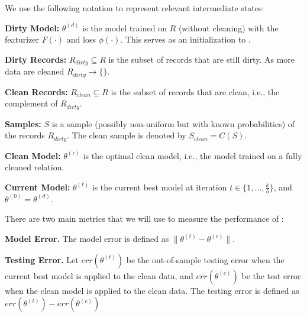 We use the following notation to represent relevant intermediate states:

\vspace{0.25em}

\noindent\textbf{Dirty Model: } $\theta^{(d)}$ is the model trained on $R$ (without cleaning) with the featurizer $F(\cdot)$ and loss $\phi(\cdot)$. This serves as an initialization to \sys.

\vspace{0.25em}

\noindent\textbf{Dirty Records: } $R_{dirty} \subseteq R$ is the subset of records that are still dirty. As more data are cleaned $R_{dirty} \rightarrow \{\}$.

\vspace{0.25em}

\noindent\textbf{Clean Records: } $R_{clean} \subseteq R$ is the subset of records that are clean, i.e., the complement of $R_{dirty}$.

\vspace{0.25em}

\noindent\textbf{Samples: } $S$ is a sample (possibly non-uniform but with known probabilities) of the records $R_{dirty}$. The clean sample is denoted by $S_{clean} = C(S)$.

\vspace{0.25em}

\noindent\textbf{Clean Model: } $\theta^{(c)}$ is the optimal clean model, i.e., the model trained on a fully cleaned relation.

\noindent\textbf{Current Model: } $\theta^{(t)}$ is the current best model at iteration $t \in \{1,...,\frac{k}{b}\}$, and $\theta^{(0)} = \theta^{(d)}$. 

\vspace{1.5em}

There are two main metrics that we will use to measure the performance of \sys:

\vspace{0.25em}

\noindent\textbf{Model Error. } The model error is defined as $\|\theta^{(t)} - \theta^{(c)}\|$.

\vspace{0.25em}

\noindent\textbf{Testing Error. } Let $err(\theta^{(t)})$ be the out-of-sample testing error when the current best model is applied to the clean data, and $err(\theta^{(c)})$ be the test error when the clean model is applied to the clean data. The testing error is defined as $err(\theta^{(t)}) - err(\theta^{(c)})$

